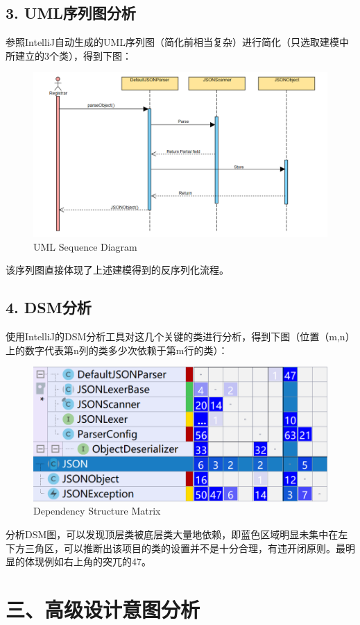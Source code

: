 \documentclass{article}
\begin{document}
\subsection*{3.	UML序列图分析}
参照IntelliJ自动生成的UML序列图（简化前相当复杂）进行简化（只选取建模中所建立的3个类），得到下图：
\begin{figure}[H]
\centering %
\includegraphics[width = 17cm]{pic14.png}
\caption{UML Sequence Diagram}
\end{figure}
该序列图直接体现了上述建模得到的反序列化流程。


\subsection*{4.	DSM分析}
使用IntelliJ的DSM分析工具对这几个关键的类进行分析，得到下图（位置（m,n）上的数字代表第n列的类多少次依赖于第m行的类）：
\begin{figure}[H]
\centering %
\includegraphics[width = 12cm]{pic15.png}
\caption{Dependency Structure Matrix}
\end{figure}
分析DSM图，可以发现顶层类被底层类大量地依赖，即蓝色区域明显未集中在左下方三角区，可以推断出该项目的类的设置并不是十分合理，有违开闭原则。最明显的体现例如右上角的突兀的47。

\section*{\Large 三、高级设计意图分析}
\end{document}
